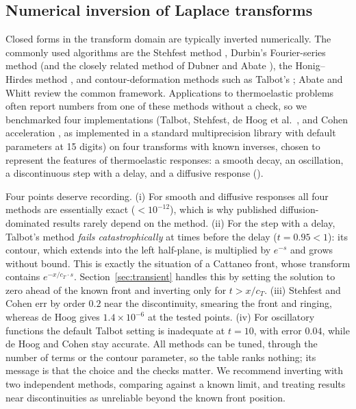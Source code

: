 \subsection{Numerical inversion of Laplace transforms}\label{sec:inversion}
Closed forms in the transform domain are typically inverted numerically. The commonly used algorithms are the Stehfest method \citep{Stehfest1970}, Durbin's Fourier-series method \citep{Durbin1974} (and the closely related method of Dubner and Abate \citep{DubnerAbate1968}), the Honig--Hirdes method \citep{HonigHirdes1984}, and contour-deformation methods such as Talbot's \citep{Talbot1979}; Abate and Whitt \citep{AbateWhitt2006} review the common framework. Applications to thermoelastic problems often report numbers from one of these methods without a check, so we benchmarked four implementations (Talbot, Stehfest, de Hoog et al.\ \citep{deHoog1982}, and Cohen acceleration \citep{Cohen2007}, as implemented in a standard multiprecision library with default parameters at 15 digits) on four transforms with known inverses, chosen to represent the features of thermoelastic responses: a smooth decay, an oscillation, a discontinuous step with a delay, and a diffusive response ().
\begin{table}[ht]\centering\small
\caption{Maximum absolute error of four numerical Laplace inversion methods on test transforms (evaluated at $t=0.5,2,5,10$; for the step at $t=0.5,0.95,1.05,2,5$). Default parameters, 15 digits. ``$4\times10^{193}$'' indicates a numerical blow-up.}\label{tab:bench}

\end{table}
Four points deserve recording. (i) For smooth and diffusive responses all four methods are essentially exact ($<10^{-12}$), which is why published diffusion-dominated results rarely depend on the method. (ii) For the step with a delay, Talbot's method \emph{fails catastrophically} at times before the delay ($t=0.95<1$): its contour, which extends into the left half-plane, is multiplied by $e^{-s}$ and grows without bound. This is exactly the situation of a Cattaneo front, whose transform contains $e^{-x/c_T\cdot s}$. Section~\ref{sec:transient} handles this by setting the solution to zero ahead of the known front and inverting only for $t>x/c_T$. (iii) Stehfest and Cohen err by order $0.2$ near the discontinuity, smearing the front and ringing, whereas de Hoog gives $1.4\times10^{-6}$ at the tested points. (iv) For oscillatory functions the default Talbot setting is inadequate at $t=10$, with error $0.04$, while de Hoog and Cohen stay accurate. All methods can be tuned, through the number of terms or the contour parameter, so the table ranks nothing; its message is that the choice and the checks matter. We recommend inverting with two independent methods, comparing against a known limit, and treating results near discontinuities as unreliable beyond the known front position.

